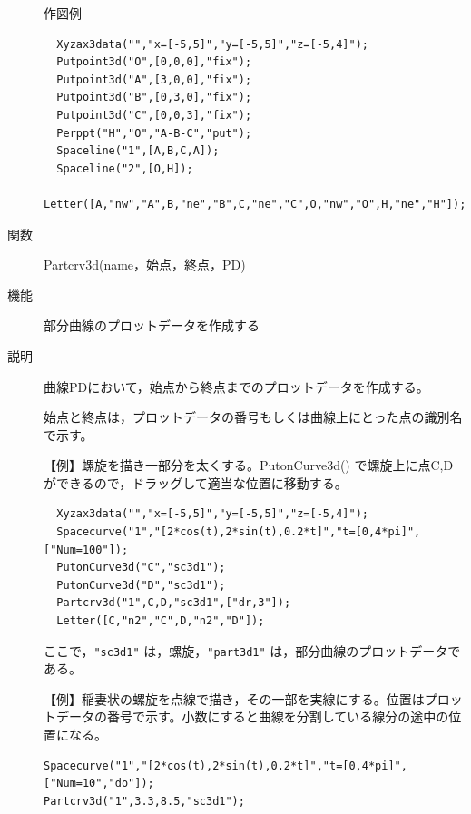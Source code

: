 \documentclass[papersize,a4paper,12pt,uplatex]{jsarticle}
\begin{document}
\begin{description}
\vspace{\baselineskip}
作図例
\begin{verbatim}
  Xyzax3data("","x=[-5,5]","y=[-5,5]","z=[-5,4]");
  Putpoint3d("O",[0,0,0],"fix");
  Putpoint3d("A",[3,0,0],"fix");
  Putpoint3d("B",[0,3,0],"fix");
  Putpoint3d("C",[0,0,3],"fix");
  Perppt("H","O","A-B-C","put");
  Spaceline("1",[A,B,C,A]);
  Spaceline("2",[O,H]);
  Letter([A,"nw","A",B,"ne","B",C,"ne","C",O,"nw","O",H,"ne","H"]);
\end{verbatim}

\vspace{\baselineskip}
\begin{center}  \end{center}

\vspace{\baselineskip}
\hypertarget{partcrv3d}{}
\item[関数]  Partcrv3d(name，始点，終点，PD)
\item[機能]  部分曲線のプロットデータを作成する
\item[説明]  曲線PDにおいて，始点から終点までのプロットデータを作成する。

始点と終点は，プロットデータの番号もしくは曲線上にとった点の識別名で示す。

\vspace{\baselineskip}
【例】螺旋を描き一部分を太くする。PutonCurve3d() で螺旋上に点C,Dができるので，ドラッグして適当な位置に移動する。
\begin{verbatim}
  Xyzax3data("","x=[-5,5]","y=[-5,5]","z=[-5,4]");
  Spacecurve("1","[2*cos(t),2*sin(t),0.2*t]","t=[0,4*pi]",["Num=100"]);
  PutonCurve3d("C","sc3d1");
  PutonCurve3d("D","sc3d1");
  Partcrv3d("1",C,D,"sc3d1",["dr,3"]);
  Letter([C,"n2","C",D,"n2","D"]);
\end{verbatim}
  ここで，\verb|"sc3d1"| は，螺旋，\verb|"part3d1"| は，部分曲線のプロットデータである。
  
\begin{center}  \end{center}

\vspace{\baselineskip}
【例】稲妻状の螺旋を点線で描き，その一部を実線にする。位置はプロットデータの番号で示す。小数にすると曲線を分割している線分の途中の位置になる。
\begin{verbatim}
Spacecurve("1","[2*cos(t),2*sin(t),0.2*t]","t=[0,4*pi]",["Num=10","do"]);
Partcrv3d("1",3.3,8.5,"sc3d1");
\end{verbatim}
              \begin{center}  \end{center}


\end{description}
\end{document}
